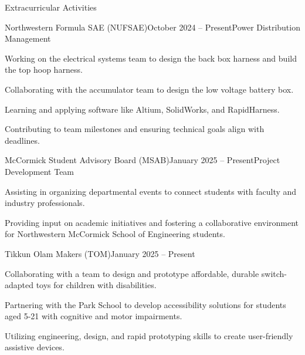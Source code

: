 \documentclass[
	a4paper, %
	9pt, %
]{resume} %
\begin{document}
\begin{rSection}{Extracurricular Activities}

    \begin{rSubsection}{Northwestern Formula SAE (NUFSAE)}{October 2024 -- Present}{Power Distribution Management}{}{}
    	\item Working on the electrical systems team to design the back box harness and build the top hoop harness.
    	\item Collaborating with the accumulator team to design the low voltage battery box.
        	\item Learning and applying software like Altium, SolidWorks, and RapidHarness.
        	\item Contributing to team milestones and ensuring technical goals align with deadlines.
    \end{rSubsection}

    \begin{rSubsection}{McCormick Student Advisory Board (MSAB)}{January 2025 -- Present}{Project Development Team}{}{}
        	\item Assisting in organizing departmental events to connect students with faculty and industry professionals.
        	\item Providing input on academic initiatives and fostering a collaborative environment for Northwestern McCormick School of Engineering  students.
    \end{rSubsection}

    \begin{rSubsection}{Tikkun Olam Makers (TOM)}{January 2025 -- Present}{}{}
    	\item Collaborating with a team to design and prototype affordable, durable switch-adapted toys for children with disabilities.
    	\item Partnering with the Park School to develop accessibility solutions for students aged 5-21 with cognitive and motor impairments.
    	\item Utilizing engineering, design, and rapid prototyping skills to create user-friendly assistive devices.
    \end{rSubsection}


\end{rSection}
\end{document}
